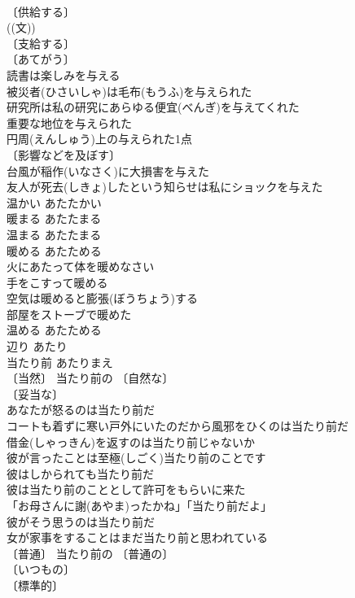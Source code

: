 \documentclass[8pt]{extreport}
\begin{document}
\begin{CJK}{UTF8}{min}
\\	〔供給する〕
\\	((文)) 
\\	〔支給する〕
\\	〔あてがう〕
\\	読書は楽しみを与える 
\\	被災者(ひさいしゃ)は毛布(もうふ)を与えられた 
\\	研究所は私の研究にあらゆる便宜(べんぎ)を与えてくれた 
\\	重要な地位を与えられた 
\\	円周(えんしゅう)上の与えられた1点 
\\	〔影響などを及ぼす〕
\\	台風が稲作(いなさく)に大損害を与えた 
\\	友人が死去(しきょ)したという知らせは私にショックを与えた 
\\	温かい	あたたかい	
\\	暖まる	あたたまる	
\\	温まる	あたたまる	
\\	暖める	あたためる	
\\	火にあたって体を暖めなさい 
\\	手をこすって暖める 
\\	空気は暖めると膨張(ぼうちょう)する 
\\	部屋をストーブで暖めた 
\\	温める	あたためる	
\\	辺り	あたり	
\\	当たり前	あたりまえ	
\\	〔当然〕 当たり前の 〔自然な〕
\\	〔妥当な〕
\\	あなたが怒るのは当たり前だ 
\\	コートも着ずに寒い戸外にいたのだから風邪をひくのは当たり前だ 
\\	借金(しゃっきん)を返すのは当たり前じゃないか 
\\	彼が言ったことは至極(しごく)当たり前のことです 
\\	彼はしかられても当たり前だ 
\\	彼は当たり前のこととして許可をもらいに来た 
\\	「お母さんに謝(あやま)ったかね」「当たり前だよ」 
\\	彼がそう思うのは当たり前だ 
\\	女が家事をすることはまだ当たり前と思われている 
\\	〔普通〕 当たり前の 〔普通の〕
\\	〔いつもの〕
\\	〔標準的〕

\end{CJK}
\end{document}

